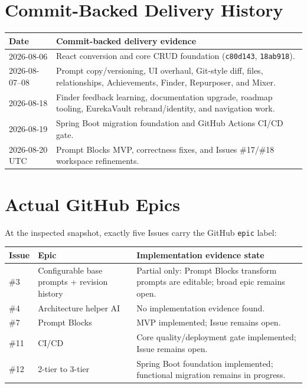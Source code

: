 \documentclass[11pt]{article}
\newcommand{\code}[1]{\texttt{#1}}
\newcommand{\commit}[1]{\texttt{#1}}
\begin{document}
\section{Commit-Backed Delivery History}

\begin{tabularx}{\textwidth}{@{}p{}X@{}}
\toprule
Date & Commit-backed delivery evidence \\
\midrule
2026-08-06 & React conversion and core CRUD foundation (\commit{c80d143}, \commit{18ab918}). \\
2026-08-07--08 & Prompt copy/versioning, UI overhaul, Git-style diff, files, relationships, Achievements, Finder, Repurposer, and Mixer. \\
2026-08-18 & Finder feedback learning, documentation upgrade, roadmap tooling, EurekaVault rebrand/identity, and navigation work. \\
2026-08-19 & Spring Boot migration foundation and GitHub Actions CI/CD gate. \\
2026-08-20 UTC & Prompt Blocks MVP, correctness fixes, and Issues \#17/\#18 workspace refinements. \\
\bottomrule
\end{tabularx}

\section{Actual GitHub Epics}

At the inspected snapshot, exactly five Issues carry the GitHub \code{epic}
label:

\begin{tabularx}{\textwidth}{@{}p{}p{}X@{}}
\toprule
Issue & Epic & Implementation evidence state \\
\midrule
\#3 & Configurable base prompts + revision history & Partial only: Prompt Blocks transform prompts are editable; broad epic remains open. \\
\#4 & Architecture helper AI & No implementation evidence found. \\
\#7 & Prompt Blocks & MVP implemented; Issue remains open. \\
\#11 & CI/CD & Core quality/deployment gate implemented; Issue remains open. \\
\#12 & 2-tier to 3-tier & Spring Boot foundation implemented; functional migration remains in progress. \\
\bottomrule
\end{tabularx}
\end{document}
